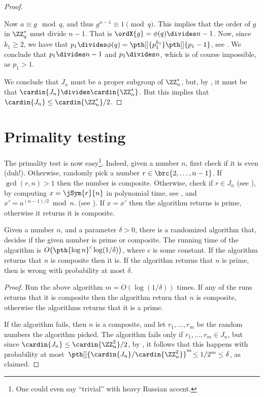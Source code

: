 \begin{proof}
\begin{compactenumA}
        Now $a \equiv g \mod q$, and thus $g^{n-1} \equiv 1
        \pmod{q}$. This implies that the order of $g$ in $\ZZ_q^*$
        must divide $n-1$. That is $\ordX{g} = \phi(q) \divides
        n-1$. Now, since $k_1 \geq 2$, we have that $p_1 \divides
        \phi(q) = \pth[]{p_1^{k_1}} \pth[]{p_1 -1}$, see
        . We conclude that $p_1
        \divides n-1$ and $p_1 \divides n$, which is of course
        impossible, as $p_1 >1$.
    \end{compactenumA}
    \medskip%
    We conclude that $J_n$ must be a proper subgroup of $\ZZ_n^*$,\newline
    but, by , it must be that
    $\cardin{J_n} \divides \cardin{\ZZ_n^*}$.  But this implies that
    $\cardin{J_n} \leq \cardin{\ZZ_n^*}/2$.
\end{proof}



\section{Primality testing}

The primality test is now easy\footnote{One could even say ``trivial''
   with heavy Russian accent.}. Indeed, given a number $n$, first
check if it is even (duh!). Otherwise, randomly pick a number $r \in
\brc{2, \ldots, n -1}$. If $\gcd( r, n) > 1$ then the number is
composite. Otherwise, check if $r \in J_n$ (see ), by
computing $x = \jSym{r}{n}$ in polynomial time, see
, and $x' =a^{(n-1)/2} \bmod{n}$.  (see
). If $x=x'$ then the algorithm returns is
prime, otherwise it returns it is composite. 

\begin{theorem}
    Given a number $n$, and a parameter $\delta >0$, there is a
    randomized algorithm that, decides if the given number is prime or
    composite.  The running time of the algorithm is $O\bigl(\pth{\log
       n}^{c} \log (1/\delta) \bigr)$, where $c$ is some constant.  If
    the algorithm returns that $n$ is composite then it is. If the
    algorithm returns that $n$ is prime, then is wrong with
    probability at most $\delta$.
\end{theorem}
\begin{proof}
    Run the above algorithm $m = O( \log (1/\delta))$ times. If any of the
    runs returns that it is composite then the algorithm return that
    $n$ is composite, otherwise the algorithms returns that it is a
    prime.

    If the algorithm fails, then $n$ is a composite, and let $r_1,
    \ldots, r_m$ be the random numbers the algorithm picked. The
    algorithm fails only if $r_1, \ldots, r_m \in J_n$, but since
    $\cardin{J_n} \leq \cardin{\ZZ_n^2}/2$, by
    , it follows that this happens with
    probability at most $\,\pth[]{\cardin{J_n} / \cardin{\ZZ_n^2}}^m
    \!  \leq 1/2^m \leq \delta$, as claimed.
\end{proof}

